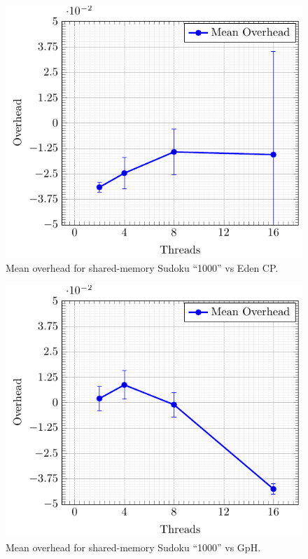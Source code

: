 \documentclass[paper=A4,twoside=true,openright,parskip=full,chapterprefix=true,headings=normal,bibliography=totoc,listof=totoc,titlepage=on,captions=tableabove,draft=false,british]{scrreprt}%
\renewcommand{\enquote}[1]{{``}#1{''}}
\begin{document}
\begin{figure}[h]
\centering
\includegraphics{src/img/overSMSudokuEden.pdf}
\caption{Mean overhead for shared-memory Sudoku \enquote{1000} vs Eden
CP.\label{fig:overSMSudokuEden}}
\end{figure}

\begin{figure}[h]
\centering
\includegraphics{src/img/overSMSudokuGpH.pdf}
\caption{Mean overhead for shared-memory Sudoku \enquote{1000} vs
GpH.\label{fig:overSMSudokuGpH}}
\end{figure}
\end{document}
